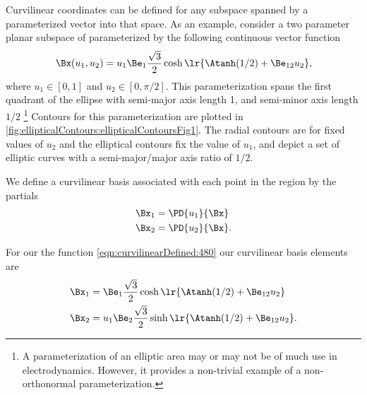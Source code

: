 %
%
Curvilinear coordinates can be defined for any subspace spanned by a parameterized vector into that space.
As an example, consider a two parameter planar subspace of parameterized by the following continuous vector function
\begin{equation}\label{eqn:curvilinearDefined:480}
\Bx(u_1, u_2) = u_1 \Be_1 \frac{\sqrt{3}}{2} \cosh\lr{ \Atanh(1/2) + \Be_{12} u_2 },
\end{equation}
where \( u_1 \in [0,1] \) and \( u_2 \in [0, \pi/2] \).
This parameterization spans the first quadrant of the ellipse with semi-major axis length 1, and semi-minor axis length \( 1/2 \)
\footnote{
A parameterization of an elliptic area may or may not be of much use in electrodynamics.  However, it provides a non-trivial example of a non-orthonormal parameterization.}
Contours for this parameterization are plotted in \cref{fig:ellipticalContours:ellipticalContoursFig1}.
The radial contours are for fixed values of \( u_2 \) and the elliptical contours fix the value of \( u_1 \), and depict a set of elliptic curves
with a semi-major/major axis ratio of \( 1/2 \).


We define a curvilinear basis associated with each point in the region by the partials
\begin{equation}\label{eqn:curvilinearDefined:80}
\begin{aligned}
\Bx_{1} &= \PD{u_1}{\Bx} \\
\Bx_{2} &= \PD{u_2}{\Bx}.
\end{aligned}
\end{equation}

For our the function \cref{eqn:curvilinearDefined:480} our curvilinear basis elements are
\begin{equation}\label{eqn:curvilinearDefined:520}
\begin{aligned}
\Bx_{1} &= \Be_1 \frac{\sqrt{3}}{2} \cosh\lr{ \Atanh(1/2) + \Be_{12} u_2 } \\
\Bx_{2} &= u_1 \Be_2 \frac{\sqrt{3}}{2} \sinh\lr{ \Atanh(1/2) + \Be_{12} u_2 }.
\end{aligned}
\end{equation}

